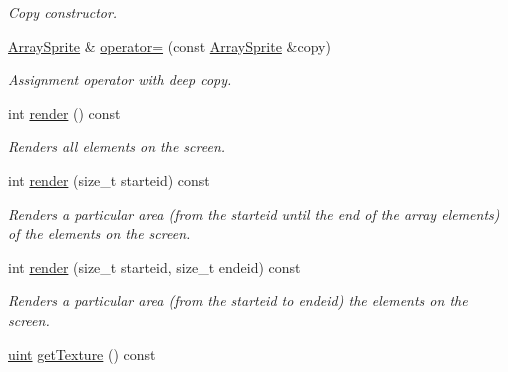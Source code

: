 \begin{DoxyCompactItemize}
\begin{DoxyCompactList}\small\item\em Copy constructor. \item\end{DoxyCompactList}\item 
\hypertarget{class_f2_c_1_1_array_sprite_afdf5f7d8a5255e25b1e9536c55344e09}{
\hyperlink{class_f2_c_1_1_array_sprite}{ArraySprite} \& \hyperlink{class_f2_c_1_1_array_sprite_afdf5f7d8a5255e25b1e9536c55344e09}{operator=} (const \hyperlink{class_f2_c_1_1_array_sprite}{ArraySprite} \&copy)}
\label{class_f2_c_1_1_array_sprite_afdf5f7d8a5255e25b1e9536c55344e09}

\begin{DoxyCompactList}\small\item\em Assignment operator with deep copy. \item\end{DoxyCompactList}\item 
int \hyperlink{class_f2_c_1_1_array_sprite_a3dc5b27cc09b3ee7b2817e5503ab0678}{render} () const 
\begin{DoxyCompactList}\small\item\em Renders all elements on the screen. \item\end{DoxyCompactList}\item 
int \hyperlink{class_f2_c_1_1_array_sprite_a7324125437c987b7fe0965f76deca762}{render} (size\_\-t starteid) const 
\begin{DoxyCompactList}\small\item\em Renders a particular area (from the starteid until the end of the array elements) of the elements on the screen. \item\end{DoxyCompactList}\item 
int \hyperlink{class_f2_c_1_1_array_sprite_a76b3b457b6fdabffc841b718d52078af}{render} (size\_\-t starteid, size\_\-t endeid) const 
\begin{DoxyCompactList}\small\item\em Renders a particular area (from the starteid to endeid) the elements on the screen. \item\end{DoxyCompactList}\item 
\hypertarget{class_f2_c_1_1_array_sprite_a427b2c19fa1f6869fee1468644789bec}{
\hyperlink{namespace_f2_c_a58be2bac9eb3e3c99cb41b6008bf4fae}{uint} \hyperlink{class_f2_c_1_1_array_sprite_a427b2c19fa1f6869fee1468644789bec}{getTexture} () const }
\label{class_f2_c_1_1_array_sprite_a427b2c19fa1f6869fee1468644789bec}


\end{DoxyCompactItemize}
